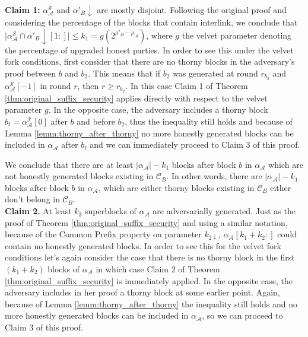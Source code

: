 \textbf{Claim 1:} $\alpha^{\mathcal{S}}_\mathcal{A}$ and
$\alpha'_B\downarrow$ are mostly disjoint. Following the original proof and considering the percentage  of the blocks that contain interlink, we conclude that 
$\vert \alpha^{\mathcal{S}}_\mathcal{A} \cap \alpha'_B\downarrow[1:] \vert \leq k_{1} = g(2^{\mu'_B - \mu_\mathcal{A}})
$, where $g$ the velvet parameter denoting the percentage of upgraded honest parties. 
In order to see this under the velvet fork conditions, first consider that there are no thorny blocks in the adversary's proof between $b$ and $b_2$. This means that if $b_2$ was generated at round $r_{b_2}$ and $\alpha^{\mathcal{S}}_\mathcal{A}[-1]$ in round $r$, then $r \geq r_{b_2}$. In this case Claim 1 of
Theorem \ref{thm:original_suffix_security} applies directly with respect to the velvet parameter $g$. In the opposite case, the adversary includes a thorny block $b_t = \alpha^{\mathcal{T}}_{\mathcal{A}}[0]$ after $b$ and before $b_2$, thus the inequality still
holds and because of Lemma \ref{lemm:thorny_after_thorny} no more honestly generated blocks can be included
in $\alpha_\mathcal{A}$ after $b_t$ and we can immediately proceed to Claim 3 of this proof.

We conclude that there are at least $\vert\alpha_\mathcal{A}\vert - k_1$
blocks after block $b$ in $\alpha_\mathcal{A}$ which are not honestly generated blocks existing in
$\mathcal{C}_B$. In other words, there are $\vert \alpha_\mathcal{A} \vert - k_1$
blocks after block $b$ in $\alpha_\mathcal{A}$, which are either thorny blocks existing in $\mathcal{C}_B$ either don't belong in $\mathcal{C}_B$.\\

\textbf{Claim 2.} 
At least $k_3$ superblocks of $\alpha_\mathcal{A}$ are adversarially generated. Just as
the proof of Theorem \ref{thm:original_suffix_security} and using a similar notation, because of the Common Prefix
property on parameter $k_{2\downarrow}$, $\alpha_\mathcal{A}[k_{1}+k_{2}:]$ could contain
no honestly generated blocks. In order to see this for the velvet fork conditions
let's again consider the case that there is no thorny block in the first
$(k_1 + k_2)$ blocks of $\alpha_\mathcal{A}$ in which case Claim 2 of Theorem 
\ref{thm:original_suffix_security} is immediately applied. In the opposite case,
the adversary includes in her proof a
thorny block at some earlier point. Again, because of Lemma 
\ref{lemm:thorny_after_thorny} the inequality still holds and no more
honestly generated blocks can be included in $\alpha_\mathcal{A}$, so we can proceed to Claim 3
of this proof.\\


